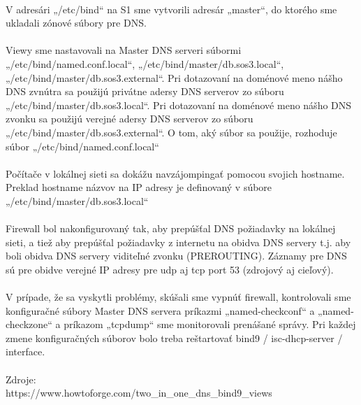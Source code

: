 \paragraph{}
V adresári „/etc/bind“ na S1 sme vytvorili adresár „master“, do ktorého sme ukladali zónové súbory pre DNS.
\paragraph{}
Viewy sme nastavovali na Master  DNS serveri súbormi „/etc/bind/named.conf.local“, „/etc/bind/master/db.sos3.local“, „/etc/bind/master/db.sos3.external“. Pri dotazovaní na doménové meno nášho DNS zvnútra sa použijú privátne adersy DNS serverov zo súboru „/etc/bind/master/db.sos3.local“. Pri dotazovaní na doménové meno nášho DNS zvonku sa použijú verejné adersy DNS serverov zo súboru „/etc/bind/master/db.sos3.external“. O tom, aký súbor sa použije, rozhoduje súbor „/etc/bind/named.conf.local“
\paragraph{}
Počítače v lokálnej sieti sa dokážu navzájompingať pomocou svojich hostname. Preklad hostname názvov na IP adresy je definovaný v súbore „/etc/bind/master/db.sos3.local“
\paragraph{}
Firewall bol nakonfigurovaný tak, aby prepúšťal DNS požiadavky na lokálnej sieti, a tiež aby prepúšťal požiadavky z internetu na obidva DNS servery t.j. aby boli obidva DNS servery viditeľné zvonku (PREROUTING). Záznamy pre DNS sú pre obidve verejné IP adresy pre udp aj tcp port 53 (zdrojový aj cieľový).
\paragraph{}
V prípade, že sa vyskytli problémy, skúšali sme vypnúť firewall, kontrolovali sme konfiguračné súbory Master DNS servera príkazmi „named-checkconf“ a „named-checkzone“ a príkazom „tcpdump“ sme monitorovali prenášané správy. Pri každej zmene konfiguračných súborov bolo treba reštartovať bind9 / isc-dhcp-server / interface.
\\
\paragraph{}
Zdroje:\\
https://www.howtoforge.com/two\_in\_one\_dns\_bind9\_views\\

